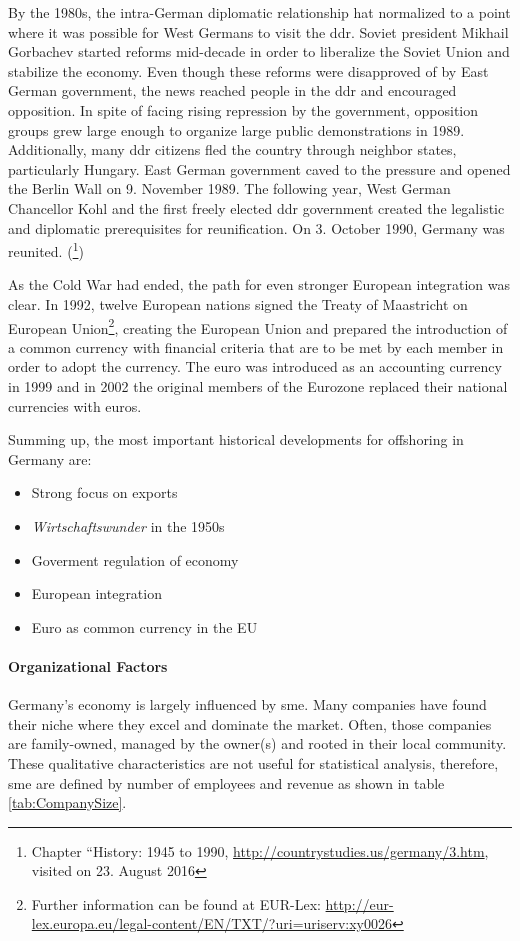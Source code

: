 By the 1980s, the intra-German diplomatic relationship hat normalized to a point where it was possible for West Germans to visit the \gls{ddr}. Soviet president Mikhail Gorbachev started reforms  mid-decade in order to liberalize the Soviet Union and stabilize the economy. Even though these reforms were disapproved of by East German government, the news reached people in the \gls{ddr} and encouraged opposition. In spite of facing rising repression by the government, opposition groups grew large enough to organize large public demonstrations in 1989. Additionally, many \gls{ddr} citizens fled the country through neighbor states, particularly Hungary. East German government caved to the pressure and opened the Berlin Wall on 9. November 1989. The following year, West German Chancellor Kohl and the first freely elected \gls{ddr} government created the legalistic and diplomatic prerequisites for reunification. On 3. October 1990, Germany was reunited.
(\cite{Solsten.1995}\footnote{Chapter ``History: 1945 to 1990, \url{http://countrystudies.us/germany/3.htm}, visited on 23. August 2016})

As the Cold War had ended, the path for even stronger European integration was clear. In 1992, twelve European nations signed the Treaty of Maastricht on European Union\footnote{Further information can be found at EUR-Lex: \url{http://eur-lex.europa.eu/legal-content/EN/TXT/?uri=uriserv:xy0026}}, creating the European Union and prepared the introduction of a common currency with financial criteria that are to be met by each member in order to adopt the currency. The euro was introduced as an accounting currency in 1999 and in 2002 the original members of the Eurozone replaced their national currencies with euros.

Summing up, the most important historical developments for offshoring in Germany are:
\begin{itemize}
	\item Strong focus on exports
	\item \textit{Wirtschaftswunder} in the 1950s
	\item Goverment regulation of economy
	\item European integration
	\item Euro as common currency in the EU
\end{itemize}


\paragraph{Organizational Factors}
Germany's economy is largely influenced by \gls{sme}. Many companies have found their niche where they excel and dominate the market. Often, those companies are family-owned, managed by the owner(s) and rooted in their local community. These qualitative characteristics are not useful for statistical analysis, therefore, \gls{sme} are defined by number of employees and revenue as shown in table \ref{tab:CompanySize}.

